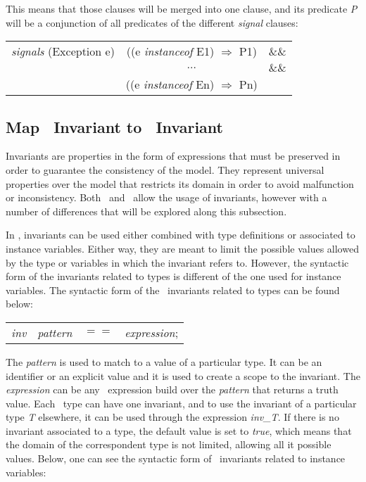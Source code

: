 This means that those clauses will be merged into one clause, and its predicate \textit{P} will be a conjunction of all predicates of the different \textit{signal} clauses:

\begin{center}
\begin{tabular}{ccc}
\textit{signals} (Exception e) & ((e \textit{instanceof} E1) $\Rightarrow$ P1) & $\&\&$ \\
 & $\ldots$ & $\&\&$ \\
 & ((e \textit{instanceof} En) $\Rightarrow$ Pn) & \\
\end{tabular}
\end{center}

\subsection{Map \vpp\ Invariant to \jml\ Invariant}

Invariants are properties in the form of expressions that must be preserved in order to guarantee the consistency of the model. They represent universal properties over the model that restricts its domain in order to avoid malfunction or inconsistency. Both \vpp\ and \jml\ allow the usage of invariants, however with a number of differences that will be explored along this subsection.

In \vpp, invariants can be used either combined with type definitions or associated to instance variables. Either way, they are meant to limit the possible values allowed by the type or variables in which the invariant refers to. However, the syntactic form of the invariants related to types is different of the one used for instance variables. The syntactic form of the \vpp\ invariants related to types can be found below:

\begin{center}
\begin{tabular}{llll}
\textit{inv} & \textit{pattern} & $==$ & \textit{expression};\\
\end{tabular}
\end{center}

The \textit{pattern} is used to match to a value of a particular type. It can be an identifier or an explicit value and it is used to create a scope to the invariant. The \textit{expression} can be any \vpp\ expression build over the \textit{pattern} that returns a truth value. Each \vpp\ type can have one invariant, and to use the invariant of a particular type \textit{T} elsewhere, it can be used through the expression \textit{inv\_T}. If there is no invariant associated to a type, the default value is set to \textit{true}, which means that the domain of the correspondent type is not limited, allowing all it possible values. Below, one can see the syntactic form of \vpp\ invariants related to instance variables:

